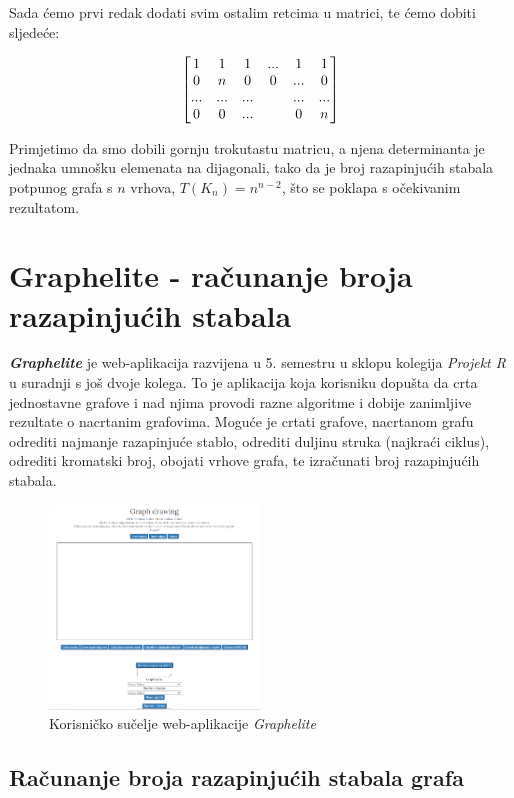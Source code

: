 \documentclass[times, utf8, zavrsni]{fer}
\begin{document}
Sada ćemo prvi redak dodati svim ostalim retcima u matrici, te ćemo dobiti sljedeće:

\[
\centering
\begin{bmatrix}
	1 & 1 & 1 & ... & 1 & 1 \\
	0 & n & 0 & 0 & ... & 0 \\
	... & ... & ... & & ... & ...  \\
	0 & 0 & ... & & 0 & n
\end{bmatrix}
\]

Primjetimo da smo dobili gornju trokutastu matricu, a njena determinanta je jednaka umnošku elemenata na dijagonali, tako da je broj razapinjućih stabala potpunog grafa s $n$ vrhova, $T(K_n) = n^{n-2}$, što se poklapa s očekivanim rezultatom.

\chapter{Graphelite - računanje broja razapinjućih stabala}

\textit{\textbf{Graphelite}} je web-aplikacija razvijena u 5. semestru u sklopu kolegija \textit{Projekt R} u suradnji s još dvoje kolega. To je aplikacija koja korisniku dopušta da crta jednostavne grafove i nad njima provodi razne algoritme i dobije zanimljive rezultate o nacrtanim grafovima. Moguće je crtati grafove, nacrtanom grafu odrediti najmanje razapinjuće stablo, odrediti duljinu struka (najkraći ciklus), odrediti kromatski broj, obojati vrhove grafa, te izračunati broj razapinjućih stabala.

\begin{figure}[htb]
	\centering
	\includegraphics[width=0.5\textwidth]{slike/graphelite.png}
	\caption{Korisničko sučelje web-aplikacije \textit{Graphelite}}
	\label{fig:graphelite}
\end{figure}

\section{Računanje broja razapinjućih stabala grafa}
\end{document}
